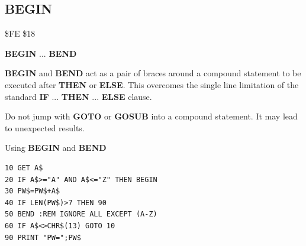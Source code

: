 \subsection{BEGIN}
\begin{description}[leftmargin=2cm,style=nextline]
\item [Token:] \$FE \$18
\item [Format:] {\bf BEGIN} ... {\bf BEND}
\item [Usage:] {\bf BEGIN} and {\bf BEND} act as
               a pair of braces around a compound statement
               to be executed after {\bf THEN} or {\bf ELSE}.
               This overcomes the single line limitation of the
               standard {\bf IF} ... {\bf THEN} ... {\bf ELSE} clause.
\item [Remarks:] Do not jump with {\bf GOTO} or {\bf GOSUB} into a
                 compound statement. It may lead to unexpected
                 results.
\item [Example:] Using {\bf BEGIN} and {\bf BEND}
\begin{tcolorbox}[colback=black,coltext=white]
\verbatimfont{\codefont}
\begin{verbatim}
10 GET A$
20 IF A$>="A" AND A$<="Z" THEN BEGIN
30 PW$=PW$+A$
40 IF LEN(PW$)>7 THEN 90
50 BEND :REM IGNORE ALL EXCEPT (A-Z)
60 IF A$<>CHR$(13) GOTO 10
90 PRINT "PW=";PW$
\end{verbatim}
\end{tcolorbox}
\end{description}


\newpage
